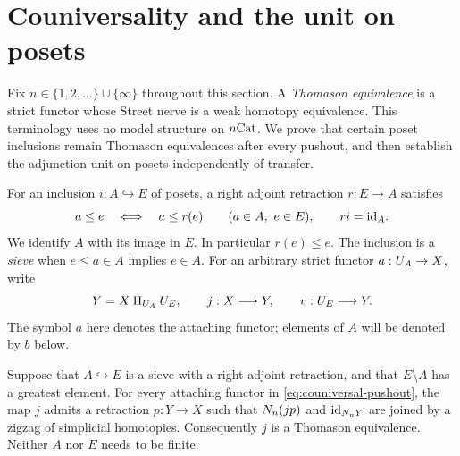 \section{Couniversality and the unit on posets}\label{sec:couniversality}

Fix $n\in\{1,2,\ldots\}\cup\{\infty\}$ throughout this section.  A
\emph{Thomason equivalence} is a strict functor whose Street nerve is a
weak homotopy equivalence.  This terminology uses no model structure on
$n\mathrm{Cat}$.  We prove that certain poset inclusions remain Thomason
equivalences after every pushout, and then establish the adjunction unit
on posets independently of transfer.

For an inclusion $i:A\hookrightarrow E$ of posets, a right adjoint
retraction $r:E\to A$ satisfies
\begin{equation}\label{eq:poset-adjunction}
  a\le e\quad\Longleftrightarrow\quad a\le r(e)
  \qquad(a\in A,\ e\in E),
  \qquad ri=\mathrm{id}_A.
\end{equation}
We identify $A$ with its image in $E$.  In particular $r(e)\le e$.
The inclusion is a \emph{sieve} when $e\le a\in A$ implies $e\in A$.
For an arbitrary strict functor $a:U_{A}\to X$, write
\begin{equation}\label{eq:couniversal-pushout}
  Y=X\amalg_{U_{A}}U_{E},\qquad
  j:X\longrightarrow Y,\qquad v:U_{E}\longrightarrow Y.
\end{equation}
The symbol $a$ here denotes the attaching functor; elements of $A$ will
be denoted by $b$ below.

\begin{lemma}\label{lem:greatest-new}
Suppose that $A\hookrightarrow E$ is a sieve with a right adjoint
retraction, and that $E\setminus A$ has a greatest element.  For every
attaching functor in \eqref{eq:couniversal-pushout}, the map $j$ admits a
retraction $p:Y\to X$ such that $N_n(jp)$ and $\mathrm{id}_{N_n Y}$ are
joined by a zigzag of simplicial homotopies.  Consequently $j$ is a
Thomason equivalence.  Neither $A$ nor $E$ needs to be finite.
\end{lemma}

